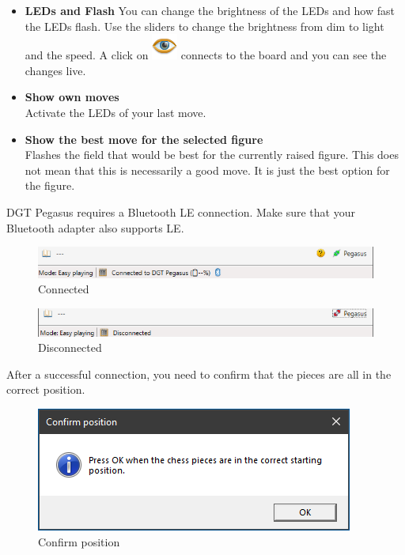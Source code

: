 \documentclass[11pt,a4paper]{article}
\begin{document}
\begin{itemize}
\item \textbf{LEDs and Flash} You can change the brightness of the LEDs and how fast the LEDs flash.
Use the sliders to change the brightness from dim to light and the speed.
A click on \includegraphics[scale=0.4]{eye.png} connects to the board and you can see the changes live.
\item \textbf{Show own moves}\\Activate the LEDs of your last move.
\item \textbf{Show the best move for the selected figure}\\Flashes the field that would be best for the currently raised figure. This does not mean that this is necessarily a good move. It is just the best option for the figure.
\end{itemize}

DGT Pegasus requires a Bluetooth LE connection. Make sure that your Bluetooth adapter also supports LE.



\begin{figure}[H]
	\centering
	\includegraphics[scale=0.8]{Pegasus2.png}
	\caption{Connected}
	\label{fig:Pegasus2}
\end{figure}

\begin{figure}[H]
	\centering
	\includegraphics[scale=0.8]{Pegasus3.png}
	\caption{Disconnected}
	\label{fig:Pegasus3}
\end{figure}

After a successful connection, you need to confirm that the pieces are all in the correct position.

\begin{figure}[H]
	\centering
	\includegraphics[scale=0.8]{Pegasus4.png}
	\caption{Confirm position}
	\label{fig:Pegasus4}
\end{figure}
\end{document}
